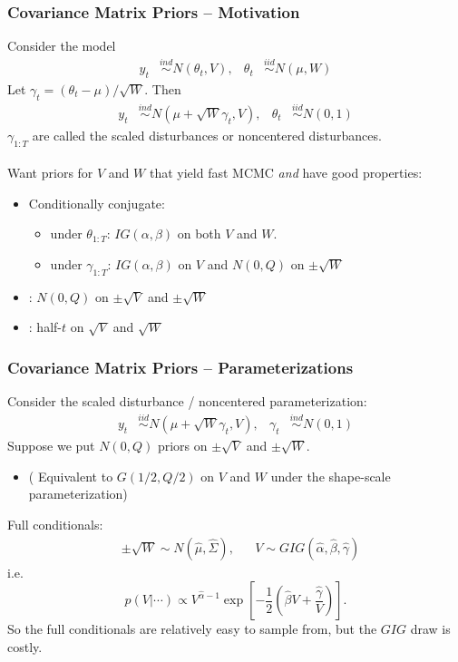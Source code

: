 \documentclass[xcolor=dvipsnames]{beamer}
\begin{document}
\begin{frame}
\frametitle{Covariance Matrix Priors -- Motivation}
Consider the model
\begin{align*}
 y_t &\stackrel{ind}{\sim} N(\theta_t, V), &\theta_t &\stackrel{iid}{\sim} N(\mu,W)
\end{align*}
\pause
Let $\gamma_t=(\theta_t-\mu)/\sqrt{W}$. Then
\begin{align*}
 y_t &\stackrel{ind}{\sim} N(\mu + \sqrt{W}\gamma_t, V), & \theta_t &\stackrel{iid}{\sim} N(0,1)
\end{align*}
$\gamma_{1:T}$ are called the scaled disturbances or noncentered disturbances.\\~\\

\pause Want priors for $V$ and $W$ that yield fast MCMC {\it and} have good properties:
\begin{itemize}
\item Conditionally conjugate:
\begin{itemize}
\item under $\theta_{1:T}$: $IG(\alpha,\beta)$ on both $V$ and $W$.
\item under $\gamma_{1:T}$: $IG(\alpha,\beta)$  on $V$ and $N(0,Q)$ on $\pm\sqrt{W}$
\end{itemize}
\item \citet{fruhwirth2008bayesian}: $N(0,Q)$ on $\pm\sqrt{V}$ and $\pm\sqrt{W}$
\item \citet{gelman2006prior}: half-$t$ on $\sqrt{V}$ and $\sqrt{W}$
\end{itemize}
\end{frame}

\begin{frame}
\frametitle{Covariance Matrix Priors -- Parameterizations}
Consider the scaled disturbance / noncentered parameterization:
\begin{align*}
 y_t &\stackrel{iid}{\sim} N(\mu + \sqrt{W}\gamma_t, V), &\gamma_t &\stackrel{ind}{\sim} N(0,1)
\end{align*}
Suppose we put $N(0,Q)$ priors on $\pm\sqrt{V}$ and $\pm\sqrt{W}$.
\begin{itemize}
\item[]( Equivalent to $G(1/2, Q/2)$ on $V$ and $W$ under the shape-scale parameterization)
\end{itemize}

\pause
Full conditionals:
\begin{align*}
&\pm\sqrt{W}\sim N(\hat{\mu},\hat{\Sigma}), &&V\sim GIG(\hat{\alpha},\hat{\beta},\hat{\gamma})
\end{align*}
i.e. 
\[
p(V|\cdots)\propto V^{\hat{\alpha} -1}\exp\left[-\frac{1}{2}\left(\hat{\beta} V + \frac{\hat{\gamma}}{V}\right)\right].
\]
 So the full conditionals are relatively easy to sample from, but the $GIG$ draw is costly.
\end{frame}
\end{document}
